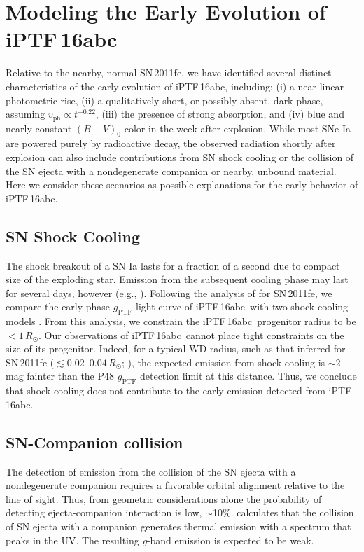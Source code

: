 \documentclass[twocolumn]{aastex61}
\newcommand{\sr}{R_\odot}
\newcommand{\abc}{iPTF\,16abc}
\begin{document}
\section{Modeling the Early Evolution of \abc} \label{sec:lc_energy}

Relative to the nearby, normal SN\,2011fe, we have identified several distinct
characteristics of the early evolution of \abc, including: (i) a near-linear
photometric rise, (ii) a qualitatively short, or possibly absent, dark phase,
assuming $v_\mathrm{ph} \propto t^{-0.22}$, (iii) the presence of strong
 absorption, and (iv) blue and nearly constant $(B - V)_0$
color in the week after explosion. While most SNe Ia are powered purely by
radioactive decay, the observed radiation shortly after explosion can also
include contributions from SN shock cooling or the collision of the SN ejecta
with a nondegenerate companion or nearby, unbound material. Here we
consider these scenarios as possible explanations for the early behavior of
\abc.

\subsection{SN Shock Cooling}

The shock breakout of a SN Ia lasts for a fraction of a second due to compact
size of the exploding star. Emission from the subsequent cooling phase may
last for several days, however (e.g., \citealt{2010ApJ...708..598P}).
Following the analysis of \citet{2012ApJ...744L..17B} for SN\,2011fe, we
compare the early-phase $g_\mathrm{PTF}$ light curve of \abc\ with two shock
cooling models \citep{2011ApJ...728...63R, 2010ApJ...708..598P}. From this
analysis, we constrain the \abc\ progenitor radius to be $<1\,\sr$. Our
observations of \abc\ cannot place tight constraints on the size of its
progenitor. Indeed, for a typical WD radius, such as that inferred for
SN\,2011fe ($\lesssim 0.02$--$0.04\,\sr$; \citealt{2012ApJ...744L..17B,
2014ApJ...784...85P}), the expected emission from shock cooling is
$\sim$2\,mag fainter than the P48 $g_\mathrm{PTF}$ detection limit at this
distance. Thus, we conclude that shock cooling does not contribute to the
early emission detected from \abc.

\subsection{SN-Companion collision}
\label{sec:companion}

The detection of emission from the collision of the SN ejecta with a
nondegenerate companion requires a favorable orbital alignment relative to
the line of sight. Thus, from geometric considerations alone the probability
of detecting ejecta-companion interaction is low, $\sim$10\%.
\citet{2010ApJ...708.1025K} calculates that the collision of SN ejecta with a
companion generates thermal emission with a spectrum that peaks in the UV. The
resulting \textit{g}-band emission is expected to be weak.
\end{document}
